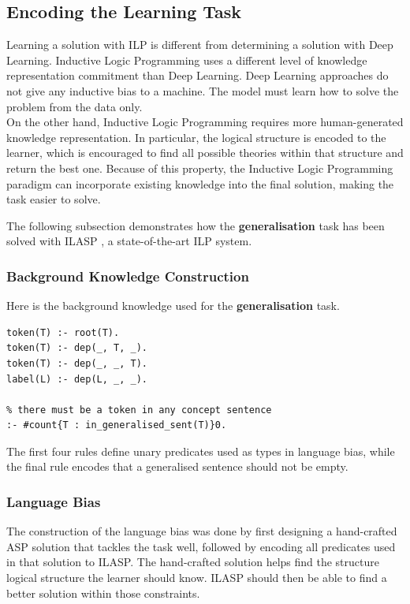 \subsection{Encoding the Learning Task}
\label{encoding-the-learning-task}

Learning a solution with ILP is different from determining a solution with Deep Learning.
Inductive Logic Programming uses a different level of knowledge representation commitment than Deep Learning.
Deep Learning approaches do not give any inductive bias to a machine. 
The model must learn how to solve the problem from the data only. \\
On the other hand, Inductive Logic Programming requires more human-generated knowledge representation.
In particular, the logical structure is encoded to the learner, which is encouraged to find all possible theories within that structure and return the best one. 
Because of this property, the Inductive Logic Programming paradigm can incorporate existing knowledge into the final solution, making the task easier to solve.

The following subsection demonstrates how the \textbf{generalisation} task has been solved with ILASP \cite{RefWorks:RefID:18-law2020ilasp}, a state-of-the-art ILP system.

\subsubsection{Background Knowledge Construction}

Here is the background knowledge used for the \textbf{generalisation} task.
\begin{verbatim}
token(T) :- root(T).
token(T) :- dep(_, T, _).
token(T) :- dep(_, _, T).
label(L) :- dep(L, _, _).

% there must be a token in any concept sentence
:- #count{T : in_generalised_sent(T)}0.
\end{verbatim}
The first four rules define unary predicates used as types in language bias, while the final rule encodes that a generalised sentence should not be empty.

\subsubsection{Language Bias}

The construction of the language bias was done by first designing a hand-crafted ASP solution that tackles the task well, followed by encoding all predicates used in that solution to ILASP.
The hand-crafted solution helps find the structure logical structure the learner should know.
ILASP should then be able to find a better solution within those constraints.


